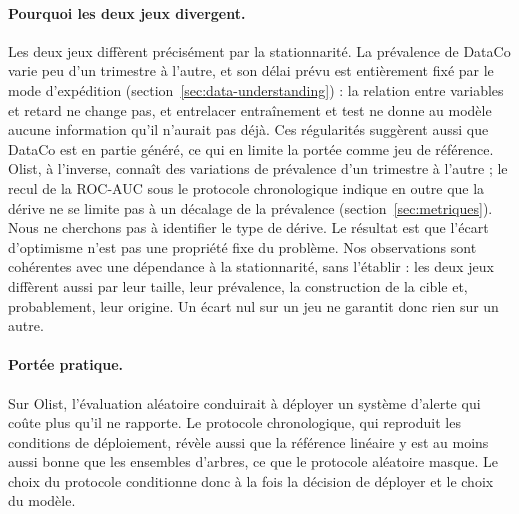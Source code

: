 \documentclass[11pt,a4paper]{article}
\theoremstyle{definition}
\begin{document}
\paragraph{Pourquoi les deux jeux divergent.} Les deux jeux diffèrent précisément par la stationnarité. La prévalence de DataCo varie peu d'un trimestre à l'autre, et son délai prévu est entièrement fixé par le mode d'expédition (section~\ref{sec:data-understanding}) : la relation entre variables et retard ne change pas, et entrelacer entraînement et test ne donne au modèle aucune information qu'il n'aurait pas déjà. Ces régularités suggèrent aussi que DataCo est en partie généré, ce qui en limite la portée comme jeu de référence. Olist, à l'inverse, connaît des variations de prévalence d'un trimestre à l'autre ; le recul de la ROC-AUC sous le protocole chronologique indique en outre que la dérive ne se limite pas à un décalage de la prévalence (section~\ref{sec:metriques}). Nous ne cherchons pas à identifier le type de dérive. Le résultat est que l'écart d'optimisme n'est pas une propriété fixe du problème. Nos observations sont cohérentes avec une dépendance à la stationnarité, sans l'établir : les deux jeux diffèrent aussi par leur taille, leur prévalence, la construction de la cible et, probablement, leur origine. Un écart nul sur un jeu ne garantit donc rien sur un autre.

\paragraph{Portée pratique.} Sur Olist, l'évaluation aléatoire conduirait à déployer un système d'alerte qui coûte plus qu'il ne rapporte. Le protocole chronologique, qui reproduit les conditions de déploiement, révèle aussi que la référence linéaire y est au moins aussi bonne que les ensembles d'arbres, ce que le protocole aléatoire masque. Le choix du protocole conditionne donc à la fois la décision de déployer et le choix du modèle.
\end{document}
